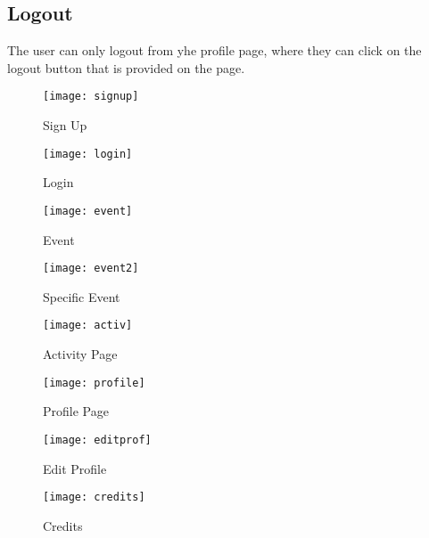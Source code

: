 \documentclass{article}
\begin{document}
\subsection{Logout}
The user can only logout from yhe profile page, where they can click on the logout 
button that is provided on the page.



\clearpage

\begin{figure}[h]
	\centering
	\texttt{[image: signup]}
	\caption{Sign Up}
\end{figure}

\begin{figure}[h]
	\centering
	\texttt{[image: login]}
	\caption{Login}
\end{figure}

\begin{figure}[h]
	\centering
	\texttt{[image: event]}
	\caption{Event}
\end{figure}

\begin{figure}[h]
	\centering
	\texttt{[image: event2]}
	\caption{Specific Event}
\end{figure}

\begin{figure}[h]
	\centering
	\texttt{[image: activ]}
	\caption{Activity Page}
\end{figure}



\begin{figure}[h]
	\centering
	\texttt{[image: profile]}
	\caption{Profile Page}
\end{figure}


\begin{figure}[h]
	\centering
	\texttt{[image: editprof]}
	\caption{Edit Profile}
\end{figure}

\begin{figure}[h]
	\centering
	\texttt{[image: credits]}
	\caption{Credits}
\end{figure}
\end{document}
